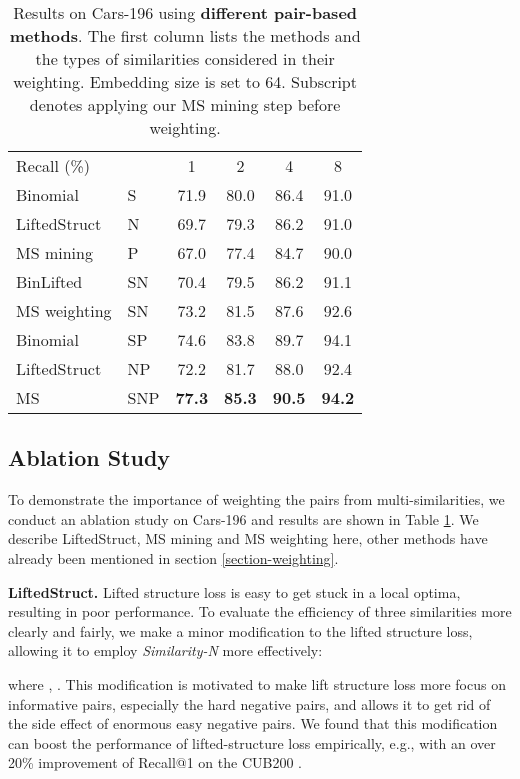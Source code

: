 \documentclass[10pt,twocolumn,letterpaper]{article}
\newcommand{\tablestyle}[2]{\setlength{\tabcolsep}{#1}\renewcommand{\arraystretch}{#2}\centering\footnotesize}
\begin{document}
\begin{table}[t]
\tablestyle{9pt}{1.1}
	\begin{tabular}{ll|cccc}
		Recall (\%) &	  &1 & 2 & 4  & 8\\ \shline
		Binomial	 &S & 71.9& 80.0& 86.4  &91.0    \\  
		LiftedStruct&N &  69.7&  79.3&  86.2  & 91.0  \\ 
		MS mining		&P  & 67.0& 77.4& 84.7& 90.0\\ \hline
		BinLifted   &SN & 70.4& 79.5& 86.2& 91.1 \\ 
		MS weighting&SN & 73.2& 81.5& 87.6& 92.6 \\ \hline
		Binomial & SP & 74.6& 83.8& 89.7& 94.1\\
		LiftedStruct & NP& 72.2& 81.7& 88.0& 92.4\\ \hline
		MS 		&SNP & \bf 77.3& \bf 85.3& \bf 90.5& \bf 94.2 \\ 
	\end{tabular}
	\vspace{1pt}
	\caption{Results on Cars-196 using \textbf{different pair-based methods}. The first column lists the methods and the types of similarities considered in their weighting. Embedding size is set to 64. Subscript  denotes applying our MS mining step before weighting.} 
	\label{tab-ablation}
	\vspace{-10pt}
\end{table}



\subsection{Ablation Study}
\label{ablation}

To  demonstrate the importance of weighting the pairs from multi-similarities, we conduct an ablation study on Cars-196 and results are shown in Table \ref{tab-ablation}.
We describe LiftedStruct, MS mining and MS weighting here, other methods have already been mentioned in section \ref{section-weighting}.  

{\bf{LiftedStruct.} }   Lifted structure loss is easy to get stuck in a local optima, resulting in poor performance. To evaluate the efficiency of three similarities more clearly and fairly, we make a minor modification to the lifted structure loss, allowing it to employ {\it Similarity-N} more effectively:
 
where , . This modification is motivated to make lift structure loss more focus on informative pairs, especially the hard negative pairs, and allows it to get rid of the side effect of enormous easy negative pairs. We found that this modification can boost the performance of lifted-structure loss empirically, e.g., with an over 20\%  improvement of Recall@1 on the CUB200 .
\end{document}

